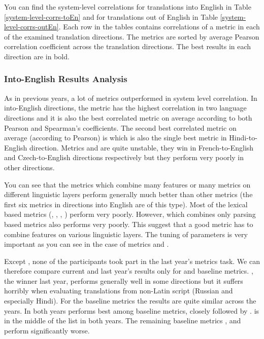 You can find the system-level correlations for translations into English in
Table \ref{system-level-corrs-toEn} and for translations out of English in
Table \ref{system-level-corrs-outEn}. Each row in the tables contains
correlations of a metric in each of the examined translation directions. The
metrics are sorted by average Pearson correlation coefficient across the
translation directions. The best results in each direction are in bold.

\subsubsection{Into-English Results Analysis}

As in previous years, a lot of metrics outperformed  in system
level correlation. In into-English directions, the metric
 has the highest correlation in two language
directions and it is also the best correlated metric on average according to both
Pearson and Spearman's coefficients. The second best correlated metric on
average (according to Pearson) is  which is also the single
best metric in Hindi-to-English direction.  Metrics  and
 are quite unstable, they win in French-to-English and
Czech-to-English directions respectively but they perform very poorly in other
directions. 

You can see that the metrics which combine many features or many metrics on
different linguistic layers perform generally much better than other metrics
(the first six metrics in directions into English are of this type).  Most of
the lexical based metrics (, , ,
) perform very poorly. However,  which
combines only parsing based metrics also performs very poorly. This suggest
that a good metric has to combine features on various linguistic layers.  The
tuning of parameters is very important as you can see in the case of metrics
 and .

Except , none of the participants took part in the last year's
metrics task.  We can therefore compare current and last year's results only for
 and baseline metrics.  , the winner last year,
performs generally well in some directions but it suffers horribly when
evaluating translations from non-Latin script (Russian and especially Hindi).
For the baseline metrics the results are quite similar across the years. In
both years  performs best among baseline metrics, closely followed
by .  is in the middle of the list in both
years. The remaining baseline metrics , 
and  perform significantly worse.

